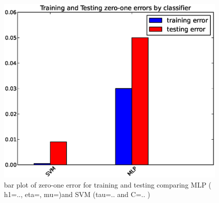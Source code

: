 \begin{figure}[!ht]
	\centering
	\includegraphics[width=\textwidth]{svm/fake_bar_plot.eps}
	\caption{bar plot of zero-one error for training and testing comparing MLP ( h1=.., eta=, mu=)and SVM (tau=.. and C=.. )}
	\label{fig:comparison}
\end{figure}